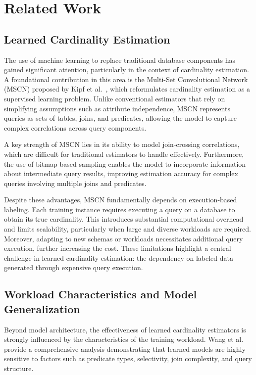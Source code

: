 \chapter{Related Work}
\label{chap:relatedwork}
\pagestyle{plain}

\section{Learned Cardinality Estimation}

The use of machine learning to replace traditional database components has gained significant attention, particularly in the context of cardinality estimation. A foundational contribution in this area is the Multi-Set Convolutional Network (MSCN) proposed by Kipf et al.~\cite{DBLP:conf/cidr/KipfKRLBK19}, which reformulates cardinality estimation as a supervised learning problem. Unlike conventional estimators that rely on simplifying assumptions such as attribute independence, MSCN represents queries as sets of tables, joins, and predicates, allowing the model to capture complex correlations across query components.

A key strength of MSCN lies in its ability to model join-crossing correlations, which are difficult for traditional estimators to handle effectively. Furthermore, the use of bitmap-based sampling enables the model to incorporate information about intermediate query results, improving estimation accuracy for complex queries involving multiple joins and predicates.

Despite these advantages, MSCN fundamentally depends on execution-based labeling. Each training instance requires executing a query on a database to obtain its true cardinality. This introduces substantial computational overhead and limits scalability, particularly when large and diverse workloads are required. Moreover, adapting to new schemas or workloads necessitates additional query execution, further increasing the cost. These limitations highlight a central challenge in learned cardinality estimation: the dependency on labeled data generated through expensive query execution.

\section{Workload Characteristics and Model Generalization}

Beyond model architecture, the effectiveness of learned cardinality estimators is strongly influenced by the characteristics of the training workload. Wang et al.~\cite{DBLP:journals/pvldb/WangQWWZ21} provide a comprehensive analysis demonstrating that learned models are highly sensitive to factors such as predicate types, selectivity, join complexity, and query structure.

